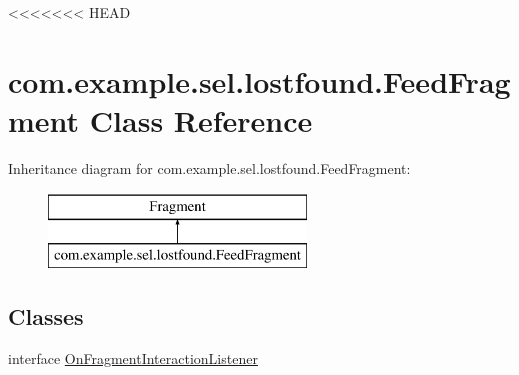 <<<<<<< HEAD
\hypertarget{classcom_1_1example_1_1sel_1_1lostfound_1_1FeedFragment}{\section{com.\-example.\-sel.\-lostfound.\-Feed\-Fragment Class Reference}
\label{classcom_1_1example_1_1sel_1_1lostfound_1_1FeedFragment}
}
Inheritance diagram for com.\-example.\-sel.\-lostfound.\-Feed\-Fragment\-:\begin{figure}[H]
\begin{center}
\leavevmode
\includegraphics[height=2.000000cm]{classcom_1_1example_1_1sel_1_1lostfound_1_1FeedFragment}
\end{center}
\end{figure}
\subsection*{Classes}
\begin{DoxyCompactItemize}
\item 
interface \hyperlink{interfacecom_1_1example_1_1sel_1_1lostfound_1_1FeedFragment_1_1OnFragmentInteractionListener}{On\-Fragment\-Interaction\-Listener}
\end{DoxyCompactItemize}
